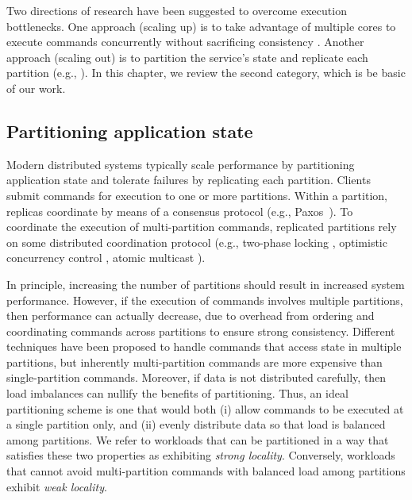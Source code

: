 Two directions of research have been suggested to overcome execution
bottlenecks. One approach (scaling up) is to take advantage of multiple cores to
execute commands concurrently without sacrificing consistency
\cite{Kapritsos:2012um,Marandi:2014bj,Kotla:2004ep,Guo:2014jp}. Another approach
(scaling out) is to partition the service's state and replicate each partition
(e.g., \cite{Glendenning:2011kj,Marandi:2011dj}). In this chapter, we review the
second category, which is be basic of our work.

\subsection{Partitioning application state}

Modern distributed systems typically scale performance by partitioning
application state and tolerate failures by replicating each partition. Clients
submit commands for execution to one or more partitions. Within a partition,
replicas coordinate by means of a consensus protocol (e.g., Paxos~\cite{Lam98}).
To coordinate the execution of multi-partition commands, replicated partitions
rely on some distributed coordination protocol (e.g., two-phase locking
\cite{corbett2013spanner}, optimistic concurrency control \cite{Chang:2008},
atomic multicast \cite{bezerra2014ssmr}).

In principle, increasing the number of partitions should result in increased
system performance. However, if the execution of commands involves multiple
partitions, then performance can actually decrease, due to overhead from
ordering and coordinating commands across partitions to ensure strong
consistency. Different techniques have been proposed to handle commands that
access state in multiple partitions, but inherently multi-partition commands are
more expensive than single-partition commands. Moreover, if data is not
distributed carefully, then load imbalances can nullify the benefits of
partitioning. Thus, an ideal partitioning scheme is one that would both (i)
allow commands to be executed at a single partition only, and (ii) evenly
distribute data so that load is balanced among partitions. We refer to workloads
that can be partitioned in a way that satisfies these two properties as
exhibiting \emph{strong locality}. Conversely, workloads that cannot avoid
multi-partition commands with balanced load among partitions exhibit \emph{weak
locality}.

